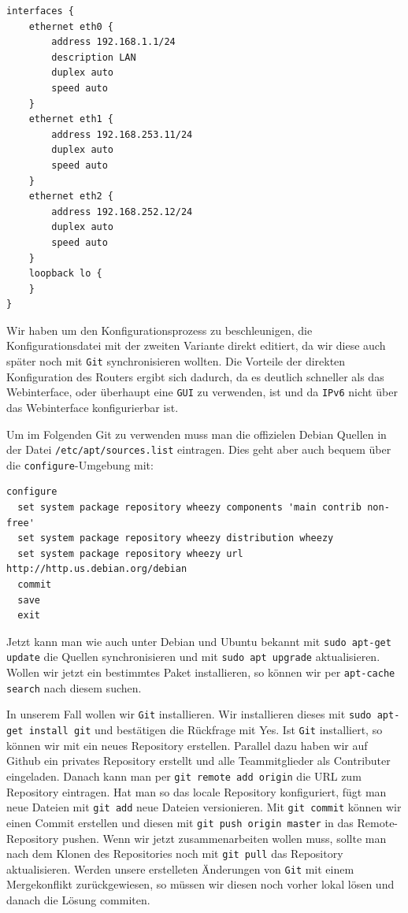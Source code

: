 \documentclass[11pt,a4paper]{article}
\begin{document}
\begin{lstlisting}[caption=config.boot von Router1]
interfaces {
    ethernet eth0 {
        address 192.168.1.1/24
        description LAN
        duplex auto
        speed auto
    }
    ethernet eth1 {
        address 192.168.253.11/24
        duplex auto
        speed auto
    }
    ethernet eth2 {
        address 192.168.252.12/24
        duplex auto
        speed auto
    }
    loopback lo {
    }
}
\end{lstlisting}
\newpage
Wir haben um den Konfigurationsprozess zu beschleunigen, die
Konfigurationsdatei mit der zweiten Variante direkt editiert, da wir
diese auch später noch mit \texttt{Git} synchronisieren wollten.  Die
Vorteile der direkten Konfiguration des Routers ergibt sich dadurch,
da es deutlich schneller als das Webinterface, oder überhaupt eine
\texttt{GUI} zu verwenden, ist und da \texttt{IPv6} nicht über das
Webinterface konfigurierbar ist.

Um im Folgenden Git zu verwenden muss man die offizielen Debian Quellen in der Datei 
\texttt{/etc/apt/sources.list} eintragen. Dies geht aber auch bequem über die \texttt{configure}-Umgebung mit:

\begin{lstlisting}[caption=Hinzufügen der Debian Quellen]
  configure
  set system package repository wheezy components 'main contrib non-free'
  set system package repository wheezy distribution wheezy 
  set system package repository wheezy url http://http.us.debian.org/debian
  commit
  save
  exit
\end{lstlisting}

Jetzt kann man wie auch unter Debian und Ubuntu bekannt mit
\texttt{sudo apt-get update} die Quellen synchronisieren und mit
\texttt{sudo apt upgrade} aktualisieren. Wollen wir jetzt ein bestimmtes Paket installieren, so können wir per \texttt{apt-cache search} nach diesem suchen. 

In unserem Fall wollen wir \texttt{Git} installieren. Wir installieren
dieses mit \texttt{sudo apt-get install git} und bestätigen die
Rückfrage mit Yes. Ist \texttt{Git} installiert, so können wir mit
 ein neues Repository erstellen. Parallel dazu haben
wir auf Github ein privates Repository erstellt und alle
Teammitglieder als Contributer eingeladen. Danach kann man per
\texttt{git remote add origin} die URL zum Repository eintragen. Hat
man so das locale Repository konfiguriert, fügt man neue Dateien mit
\texttt{git add} neue Dateien versionieren.  Mit \texttt{git commit}
können wir einen Commit erstellen und diesen mit \texttt{git push
  origin master} in das Remote-Repository pushen. Wenn wir jetzt
zusammenarbeiten wollen muss, sollte man nach dem Klonen des
Repositories noch mit \texttt{git pull} das Repository
aktualisieren. Werden unsere erstelleten Änderungen von \texttt{Git}
mit einem Mergekonflikt zurückgewiesen, so müssen wir diesen noch
vorher lokal lösen und danach die Lösung commiten.
\end{document}
